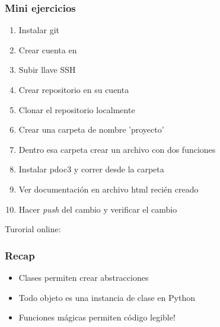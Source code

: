 \documentclass[14pt,aspectratio=169,xcolor=dvipsnames]{beamer}
\begin{document}
\begin{frame}[noframenumbering]\frametitle{Mini ejercicios}
    \begin{enumerate}
        \item Instalar git
        \item Crear cuenta en 
        \item Subir llave SSH
        \item Crear repositorio en su cuenta
        \item Clonar el repositorio localmente
        \item Crear una carpeta de nombre 'proyecto'
        \item Dentro esa carpeta crear un archivo con dos funciones
        \item Instalar pdoc3 y correr  desde la carpeta
        \item Ver documentación en archivo html recién creado

        \item Hacer \emph{push} del cambio y verificar el cambio
    \end{enumerate}
    
    \begin{center}
        Turorial online: 
    \end{center}
\end{frame}
\begin{frame}\frametitle{Recap}
    \begin{itemize}
        \item Clases permiten crear abstracciones
        \item Todo objeto es una instancia de clase en Python
        \item Funciones mágicas permiten código legible!
    \end{itemize}
\end{frame}
\begin{frame}
    \maketitle
\end{frame}
\end{document}
